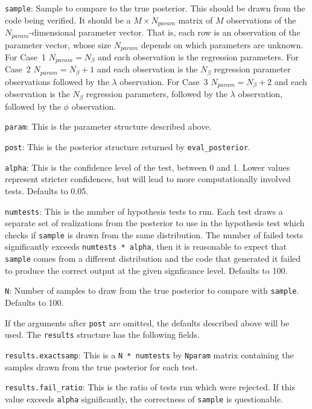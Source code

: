 \documentclass{book}
\begin{document}
\vspace{.1in}
{\tt sample}: Sample to compare to the true posterior. This should be drawn from the code being verified. It should be
a $M \times N_{param}$ matrix of $M$ observations of the $N_{param}$-dimensional parameter vector. That is, each
row is an observation of the parameter vector, whose size $N_{param}$ depends on which parameters are unknown. 
For Case~1 $N_{param} = N_\beta$ and each observation is the regression parameters. For Case~2 
$N_{param} = N_\beta + 1$ and each observation is the $N_\beta$ regression parameter observations followed by the 
$\lambda$ observation. For Case~3 $N_{param} = N_\beta + 2$ and each observation is the $N_\beta$ regression 
parameters, followed by the $\lambda$ observation, followed by the $\phi$ observation. 

{\tt param}: This is the parameter structure described above.

{\tt post}: This is the posterior structure returned by {\tt eval\_posterior}.

{\tt alpha}: This is the confidence level of the test, between 0 and 1. Lower values represent stricter confidences, but
will lead to more computationally involved tests. Defaults to 0.05. 

{\tt numtests}: This is the number of hypothesis tests to run. Each test draws a separate set of realizations from the
posterior to use in the hypothesis test which checks if {\tt sample} is drawn from the same distribution. The number
of failed tests significantly exceeds {\tt numtests * alpha}, then it is reasonable to expect that {\tt sample}
comes from a different distribution and the code that generated it failed to produce the correct output at the given
signficance level. Defaults to 100.

{\tt N}: Number of samples to draw from the true posterior to compare with {\tt sample}. Defaults to 100. 

If the arguments after {\tt post} are omitted, the defaults described above will be used. The {\tt results} structure
has the following fields. 

\vspace{.1in}
{\tt results.exactsamp}: This is a {\tt N * numtests} by {\tt Nparam} matrix containing the samples drawn from the
true posterior for each test. 

{\tt results.fail\_ratio}: This is the ratio of tests run which were rejected. If this value exceeds {\tt alpha} significantly,
the correctness of {\tt sample} is questionable. 
\end{document}
